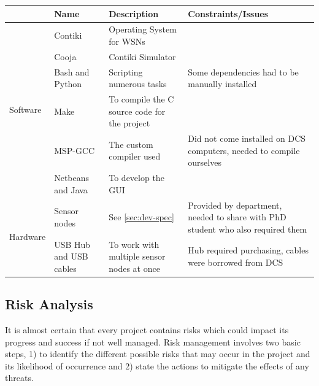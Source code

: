 \begin{table}[H]
\centering
\begin{tabular}{| l | p{2.5cm} | p{4.5cm} | p{4.25cm} |}
	\hline
	~ & Name & Description & Constraints/Issues\\
	\hline

	\multirow{6}{*}{Software} & Contiki & Operating System for WSNs & ~
	
	\\ \cline{2-4}

	& Cooja & Contiki Simulator & ~
	
	\\ \cline{2-4}

	& Bash and Python & Scripting numerous tasks & Some dependencies had to be manually installed\\ 
	\cline{2-4}

	& Make & To compile the C source code for the project & ~\\ 
	\cline{2-4}

	& MSP-GCC & The custom compiler used & Did not come installed on DCS computers, needed to compile ourselves\\ 
	\cline{2-4}

	& Netbeans and Java & To develop the GUI & ~\\ 
	\hline

	\multirow{2}{*}{Hardware} & Sensor nodes & See \autoref{sec:dev-spec} & Provided by department, needed to share with PhD student who also required them\\ 
	\cline{2-4}

	& USB Hub and USB cables & To work with multiple sensor nodes at once & Hub required purchasing, cables were borrowed from DCS\\
	\cline{2-4}
	
	\hline

\end{tabular}
\end{table}


\subsection{Risk Analysis}
It is almost certain that every project contains risks which could impact its progress and success if not well managed. Risk management involves two basic steps, 1) to identify the different possible risks that may occur in the project and its likelihood of occurrence and 2) state the actions to mitigate the effects of any threats.

